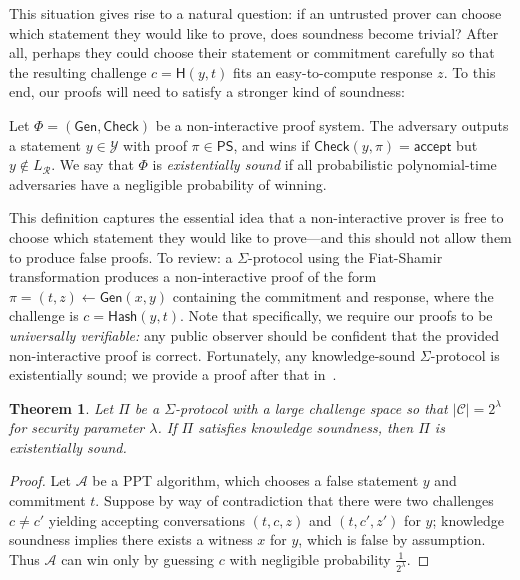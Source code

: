\documentclass[12pt,a4paper]{article}
\newtheorem{theorem}{Theorem}
\theoremstyle{definition}
\begin{document}
This situation gives rise to a natural question: if an untrusted prover can choose which statement they would like to prove, does soundness become trivial? After all, perhaps they could choose their statement or commitment carefully so that the resulting challenge $c = \mathsf{H}(y, t)$ fits an easy-to-compute response $z$. To this end, our proofs will need to satisfy a stronger kind of soundness:
\begin{definition}
    Let $\Phi=(\mathsf{Gen}, \mathsf{Check})$ be a non-interactive proof system. The adversary outputs a statement $y\in\mathcal{Y}$ with proof $\pi\in\mathsf{PS}$, and wins if $\mathsf{Check}(y, \pi)=\mathsf{accept}$ but $y\notin L_\mathcal{R}$. We say that $\Phi$ is \textit{existentially sound} if all probabilistic polynomial-time adversaries have a negligible probability of winning.
\end{definition}

This definition captures the essential idea that a non-interactive prover is free to choose which statement they would like to prove---and this should not allow them to produce false proofs. To review: a $\Sigma$-protocol using the Fiat-Shamir transformation produces a non-interactive proof of the form $\pi = (t, z)\gets\mathsf{Gen}(x, y)$ containing the commitment and response, where the challenge is $c = \mathsf{Hash}(y, t)$. Note that specifically, we require our proofs to be \textit{universally verifiable:} any public observer should be confident that the provided non-interactive proof is correct. Fortunately, any knowledge-sound $\Sigma$-protocol is existentially sound; we provide a proof after that in~\cite{boneh2020graduate}.

\begin{theorem}
    Let $\Pi$ be a $\Sigma$-protocol with a large challenge space so that $|\mathcal{C}| = 2^\lambda$ for security parameter $\lambda$. If $\Pi$ satisfies knowledge soundness, then $\Pi$ is existentially sound.
\end{theorem}
\begin{proof}
    Let $\mathcal{A}$ be a PPT algorithm, which chooses a false statement $y$ and commitment $t$. Suppose by way of contradiction that there were two challenges $c\neq c'$ yielding accepting conversations $(t, c, z)$ and $(t, c', z')$ for $y$; knowledge soundness implies there exists a witness $x$ for $y$, which is false by assumption. Thus $\mathcal{A}$ can win only by guessing $c$ with negligible probability $\frac{1}{2^\lambda}$.
\end{proof}
\end{document}
